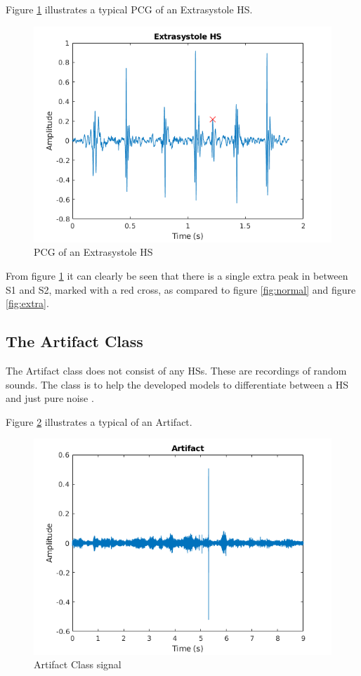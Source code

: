 \documentclass[10pt,twocolumn]{witseiepaper}
\begin{document}

Figure \ref{fig:extrasys} illustrates a typical PCG of an Extrasystole HS.
\begin{figure}[h!]
    \centering
    \includegraphics[scale = 0.45]{./extrasys.png}
    \caption{PCG of an Extrasystole HS}
    \label{fig:extrasys}
\end{figure}{}

From figure \ref{fig:extrasys} it can clearly be seen that there is a single extra peak in between S1 and S2, marked with a red cross, as compared to figure \ref{fig:normal} and figure \ref{fig:extra}.

\subsection*{The Artifact Class}
\label{sec:arti}
The Artifact class does not consist of any HSs. These are recordings of random sounds. The class is to help the developed models to differentiate between a HS and just pure noise \cite{bentley}.

Figure \ref{fig:arti} illustrates a typical of an Artifact.
\begin{figure}[h!]
    \centering
    \includegraphics[scale = 0.45]{./arti.png}
    \caption{Artifact Class signal}
    \label{fig:arti}
\end{figure}{}
\end{document}
